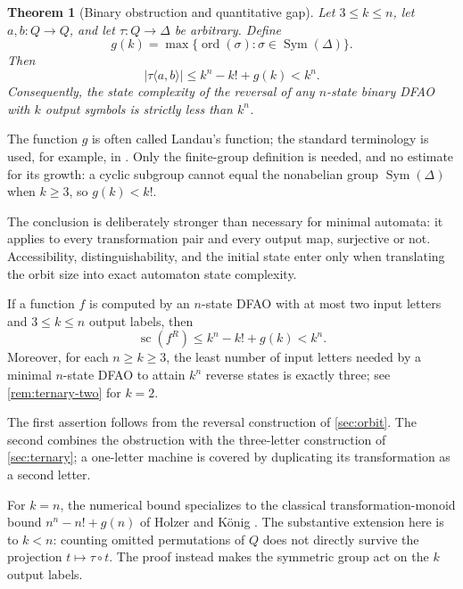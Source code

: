 \documentclass[11pt,a4paper]{article}
\numberwithin{equation}{section}
\newtheorem{theorem}{Theorem}[section]
\theoremstyle{definition}
\theoremstyle{remark}
\newcommand{\D}{\Delta}
\newcommand{\Sym}{\operatorname{Sym}}
\newcommand{\ord}{\operatorname{ord}}
\newcommand{\statecomplex}{\operatorname{sc}}
\begin{document}
\begin{theorem}[Binary obstruction and quantitative gap]\label{thm:main}
Let $3\le k\le n$, let $a,b:Q\to Q$, and let $\tau:Q\to\D$ be arbitrary.
Define
\[
 g(k)=\max\{\ord(\sigma):\sigma\in\Sym(\D)\}.
\]
Then
\begin{equation}\label{eq:main}
 |\tau\langle a,b\rangle|\le k^n-k!+g(k)<k^n.
\end{equation}
Consequently, the state complexity of the reversal of any $n$-state binary
DFAO with $k$ output symbols is strictly less than $k^n$.
\end{theorem}

The function $g$ is often called Landau's function; the standard terminology
is used, for example, in \cite{landau}. Only the finite-group definition is
needed, and no estimate for its growth: a cyclic subgroup cannot equal the
nonabelian group $\Sym(\D)$ when $k\ge3$, so $g(k)<k!$.

The conclusion is deliberately stronger than necessary for minimal automata:
it applies to every transformation pair and every output map, surjective or
not. Accessibility, distinguishability, and the initial state enter only when
translating the orbit size into exact automaton state complexity.

\begin{corollary}\label{cor:sc}
If a function $f$ is computed by an $n$-state DFAO with at most two input
letters and $3\le k\le n$ output labels, then
\[
 \statecomplex(f^R)\le k^n-k!+g(k)<k^n.
\]
Moreover, for each $n\ge k\ge3$, the least number of input letters needed by
a minimal $n$-state DFAO to attain $k^n$ reverse states is exactly three; see
\cref{rem:ternary-two} for $k=2$.
\end{corollary}

The first assertion follows from the reversal construction of
\cref{sec:orbit}. The second combines the obstruction with the three-letter
construction of \cref{sec:ternary}; a one-letter machine is covered by
duplicating its transformation as a second letter.

For $k=n$, the numerical bound specializes to the classical
transformation-monoid bound $n^n-n!+g(n)$ of Holzer and K\"onig
\cite[Theorem~13]{HolzerKoenig2004}. The substantive extension here is to
$k<n$: counting omitted permutations of $Q$ does not directly survive the
projection $t\mapsto\tau\circ t$. The proof instead makes the symmetric
group act on the $k$ output labels.
\end{document}
